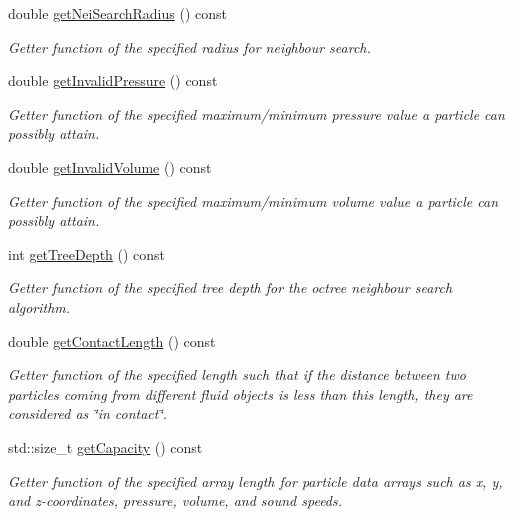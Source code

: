 \begin{DoxyCompactItemize}
double \hyperlink{classInitializer_ad2c591d1796c255cb62c0e90c5c0a875}{get\-Nei\-Search\-Radius} () const 
\begin{DoxyCompactList}\small\item\em Getter function of the specified radius for neighbour search. \end{DoxyCompactList}\item 
double \hyperlink{classInitializer_a9607400f0e0115fb7b677423403e2144}{get\-Invalid\-Pressure} () const 
\begin{DoxyCompactList}\small\item\em Getter function of the specified maximum/minimum pressure value a particle can possibly attain. \end{DoxyCompactList}\item 
double \hyperlink{classInitializer_a007b62d5ce2c5f19bf1bd379498ef64b}{get\-Invalid\-Volume} () const 
\begin{DoxyCompactList}\small\item\em Getter function of the specified maximum/minimum volume value a particle can possibly attain. \end{DoxyCompactList}\item 
int \hyperlink{classInitializer_ada300941810ded357d47b0f60c78eff9}{get\-Tree\-Depth} () const 
\begin{DoxyCompactList}\small\item\em Getter function of the specified tree depth for the octree neighbour search algorithm. \end{DoxyCompactList}\item 
double \hyperlink{classInitializer_a2ab802f1e315b413d2f9a7cf409e8330}{get\-Contact\-Length} () const 
\begin{DoxyCompactList}\small\item\em Getter function of the specified length such that if the distance between two particles coming from different fluid objects is less than this length, they are considered as \char`\"{}in contact\char`\"{}. \end{DoxyCompactList}\item 
std\-::size\-\_\-t \hyperlink{classInitializer_ab6879dbbdc2362c8d274a5b25ec2bb28}{get\-Capacity} () const 
\begin{DoxyCompactList}\small\item\em Getter function of the specified array length for particle data arrays such as x, y, and z-\/coordinates, pressure, volume, and sound speeds. \end{DoxyCompactList}\item 

\end{DoxyCompactItemize}
